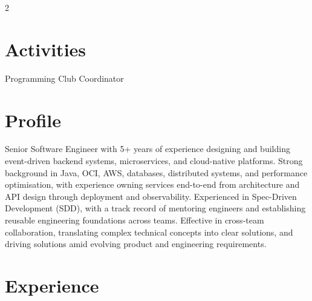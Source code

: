 \documentclass[]{hieudo-build}
\begin{document}
\begin{paracol}{2}
\sectionsep

\section{Activities}
Programming Club Coordinator\\
\sectionsep

\switchcolumn

%
%

\section{Profile}
Senior Software Engineer with 5+ years of experience designing and building event-driven backend systems, microservices, and cloud-native platforms. Strong background in Java, OCI, AWS, databases, distributed systems, and performance optimisation, with experience owning services end-to-end from architecture and API design through deployment and observability. Experienced in Spec-Driven Development (SDD), with a track record of mentoring engineers and establishing reusable engineering foundations across teams. Effective in cross-team collaboration, translating complex technical concepts into clear solutions, and driving solutions amid evolving product and engineering requirements.

\sectionsep

\section{Experience}



\end{paracol}
\end{document}
